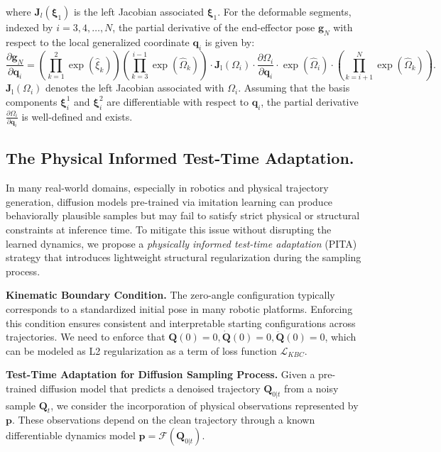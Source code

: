 \documentclass{article}
\begin{document}
where $ \mathbf{J}_l(\boldsymbol{\xi}_1)$ is the left Jacobian associated $\boldsymbol{\xi}_1$.
For the deformable segments, indexed by $i = 3, 4, \ldots, N$, the partial derivative of the end-effector pose $\mathbf{g}_N$ with respect to the local generalized coordinate $\boldsymbol{q}_i$ is given by:
\begin{equation}
\frac{\partial \mathbf{g}_N}{\partial \boldsymbol{q}_i}
=
\left( \prod_{k=1}^{2} \exp(\widehat{\xi}_k) \right)\left( \prod_{k=3}^{i-1} \exp(\widehat{\Omega}_k) \right)
\cdot \mathbf{J}_{\text{l}}(\Omega_i)
\cdot \frac{\partial \Omega_i}{\partial \boldsymbol{q}_i}
\cdot \exp(\widehat{\Omega}_i)
\cdot \left( \prod_{k=i+1}^{N} \exp(\widehat{\Omega}_k) \right).
\end{equation}
$\mathbf{J}_{\text{l}}(\Omega_i)$ denotes the left Jacobian associated with $\Omega_i$. Assuming that the basis components $\boldsymbol{\xi}_i^1$ and $\boldsymbol{\xi}_i^2$ are differentiable with respect to $\boldsymbol{q}_i$, the partial derivative $\frac{\partial \Omega_i}{\partial \boldsymbol{q}_i}$ is well-defined and exists.








\subsection{The Physical Informed Test-Time Adaptation.}
In many real-world domains, especially in robotics and physical trajectory generation, diffusion models pre-trained via imitation learning can produce behaviorally plausible samples but may fail to satisfy strict physical or structural constraints at inference time. To mitigate this issue without disrupting the learned dynamics, we propose a \textit{physically informed test-time adaptation} (PITA) strategy that introduces lightweight structural regularization during the sampling process.

\textbf{Kinematic Boundary Condition.}
The zero-angle configuration typically corresponds to a standardized initial pose in many robotic platforms. Enforcing this condition ensures consistent and interpretable starting configurations across trajectories.
We need to enforce that $\bm{Q}(0)=0, \dot{\bm{Q}}(0)=0, \ddot{\bm{Q}}(0)=0$, which can be modeled as L2 regularization as a term of loss function $\mathcal{L}_{KBC}$.

\textbf{Test-Time Adaptation for Diffusion Sampling Process.}
Given a pre-trained diffusion model that predicts a denoised trajectory $\bm{Q}_{0|t}$ from a noisy sample $\bm{Q}_t$, we consider the incorporation of physical observations represented by $\bm{p}$. These observations depend on the clean trajectory through a known differentiable dynamics model $\bm{p} = \mathcal{F}(\bm{Q}_{0|t})$.
\end{document}
